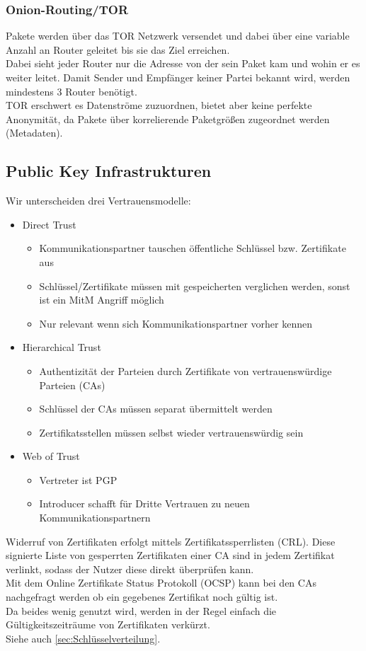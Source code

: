 \documentclass[a4paper,12pt,leqno]{article}
\begin{document}
\subsubsection{Onion-Routing/TOR}
Pakete werden über das TOR Netzwerk versendet und dabei über eine variable Anzahl an Router geleitet bis sie das Ziel erreichen.\\
Dabei sieht jeder Router nur die Adresse von der sein Paket kam und wohin er es weiter leitet. Damit Sender und Empfänger keiner Partei bekannt wird, werden mindestens 3 Router benötigt.\\
TOR erschwert es Datenströme zuzuordnen, bietet aber keine perfekte Anonymität, da Pakete über korrelierende Paketgrößen zugeordnet werden (Metadaten).

\subsection{Public Key Infrastrukturen}

Wir unterscheiden drei Vertrauensmodelle:
\begin{itemize}
\item Direct Trust
	\begin{itemize}
		\item Kommunikationspartner tauschen öffentliche Schlüssel bzw. Zertifikate aus\\
		\item Schlüssel/Zertifikate müssen mit gespeicherten verglichen werden, sonst ist ein MitM Angriff möglich
		\item Nur relevant wenn sich Kommunikationspartner vorher kennen
	\end{itemize}
\item Hierarchical Trust
	\begin{itemize}
		\item Authentizität der Parteien durch Zertifikate von vertrauenswürdige Parteien (CAs)
		\item Schlüssel der CAs müssen separat übermittelt werden
		\item Zertifikatsstellen müssen selbst wieder vertrauenswürdig sein
	\end{itemize}
\item Web of Trust
	\begin{itemize}
		\item Vertreter ist PGP\\
		\item Introducer schafft für Dritte Vertrauen zu neuen Kommunikationspartnern
	\end{itemize}
\end{itemize}

Widerruf von Zertifikaten erfolgt mittels Zertifikatssperrlisten (CRL). Diese signierte Liste von gesperrten Zertifikaten einer CA sind in jedem Zertifikat verlinkt, sodass der Nutzer diese direkt überprüfen kann.\\
Mit dem Online Zertifikate Status Protokoll (OCSP) kann bei den CAs nachgefragt werden ob ein gegebenes Zertifikat noch gültig ist.\\
Da beides wenig genutzt wird, werden in der Regel einfach die Gültigkeitszeiträume von Zertifikaten verkürzt.\\

Siehe auch \ref{sec:Schlüsselverteilung}.
\end{document}

